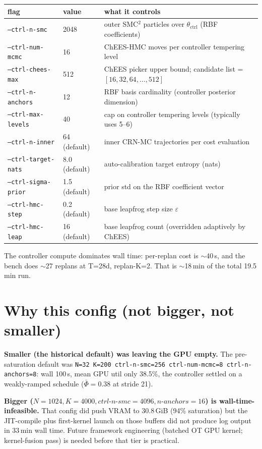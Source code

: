 \documentclass[11pt,a4paper]{article}
\begin{document}
\begin{tabular}{lll}
\toprule
flag & value & what it controls \\
\midrule
\texttt{--ctrl-n-smc}        & 2048 & outer SMC$^2$ particles over $\theta_{\text{ctrl}}$ (RBF coefficients) \\
\texttt{--ctrl-num-mcmc}     & 16   & ChEES-HMC moves per controller tempering level \\
\texttt{--ctrl-chees-max}    & 512  & ChEES picker upper bound; candidate list = $[16, 32, 64, \ldots, 512]$ \\
\texttt{--ctrl-n-anchors}    & 12   & RBF basis cardinality (controller posterior dimension) \\
\texttt{--ctrl-max-levels}   & 40   & cap on controller tempering levels (typically uses 5--6) \\
\texttt{--ctrl-n-inner}      & 64 (default) & inner CRN-MC trajectories per cost evaluation \\
\texttt{--ctrl-target-nats}  & 8.0 (default) & auto-calibration target entropy (nats) \\
\texttt{--ctrl-sigma-prior}  & 1.5 (default) & prior std on the RBF coefficient vector \\
\texttt{--ctrl-hmc-step}     & 0.2 (default) & base leapfrog step size $\varepsilon$ \\
\texttt{--ctrl-hmc-leap}     & 16  (default) & base leapfrog count (overridden adaptively by ChEES) \\
\bottomrule
\end{tabular}

The controller compute dominates wall time: per-replan cost is
$\sim$40\,s, and the bench does $\sim$27 replans at T=28d, replan-K=2.
That is $\sim$18\,min of the total 19.5\,min run.

\section*{Why this config (not bigger, not smaller)}

\textbf{Smaller (the historical default) was leaving the GPU empty.}
The pre-saturation default was \texttt{N=32 K=200 ctrl-n-smc=256
ctrl-num-mcmc=8 ctrl-n-anchors=8}: wall 100\,s, mean GPU util only
38.5\%, the controller settled on a weakly-ramped schedule
($\bar\Phi=0.38$ at stride 21).

\textbf{Bigger ($N{=}1024, K{=}4000, \mathit{ctrl{\text{-}}n{\text{-}}smc}{=}4096,
\mathit{n{\text{-}}anchors}{=}16$) is wall-time-infeasible.} That
config did push VRAM to 30.8\,GiB (94\% saturation) but the JIT-compile
plus first-kernel launch on those buffers did not produce log output
in 33\,min wall time. Future framework engineering (batched OT GPU
kernel; kernel-fusion pass) is needed before that tier is practical.
\end{document}
